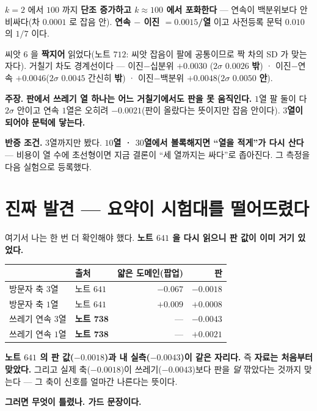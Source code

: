 \documentclass[10pt,a4paper]{article}
\newcommand{\claim}[2]{\begin{claimbox}\textbf{주장.} #1\par\smallskip
  \textcolor{gray!70}{\textbf{반증 조건.} #2}\end{claimbox}}
\begin{document}
$k{=}2$ 에서 $100$ 까지 \textbf{단조 증가하고 $k \approx 100$ 에서 포화한다} ---
연속이 백분위보다 안 비싸다(차 $0.0001$ 로 잡음 안). \textbf{연속 $-$ 이진 $=
0.0015$/열} 이고 사전등록 문턱 $0.010$ 의 $1/7$ 이다.

씨앗 $6$ 을 \textbf{짝지어} 읽었다(노트 $712$: 씨앗 잡음이 팔에 공통이므로
짝 차의 SD 가 맞는 자다). 거칠기 차도 경계선이다 --- 이진$-$십분위 $+0.0030$
($2\sigma$ $0.0026$ \textbf{밖}) · 이진$-$연속 $+0.0046$($2\sigma$ $0.0045$
간신히 \textbf{밖}) · 이진$-$백분위 $+0.0048$($2\sigma$ $0.0050$ \textbf{안}).

\claim{\textbf{판에서 쓰레기 열 하나는 어느 거칠기에서도 판을 못 움직인다.}
$1$열 팔 둘이 다 $2\sigma$ 안이고 연속 $1$열은 오히려 $-0.0021$(판이 올랐다는
뜻이지만 잡음 안이다). \textbf{$3$열이 되어야 문턱에 닿는다.}}
{$3$열까지만 봤다. \textbf{$10$열 · $30$열에서 볼록해지면 ``열을 적게''가 다시
산다} --- 비용이 열 수에 초선형이면 지금 결론이 ``세 열까지는 싸다''로 좁아진다.
그 측정을 다음 실험으로 등록했다.}

\section{진짜 발견 --- 요약이 시험대를 떨어뜨렸다}

여기서 나는 한 번 더 확인해야 했다. \textbf{노트 $641$ 을 다시 읽으니 판 값이 이미
거기 있었다.}

\begin{center}
\begin{tabular}{llrr}
\toprule
& 출처 & 얇은 도메인(팝업) & \textbf{판} \\
\midrule
방문자 축 $3$열 & 노트 $641$ & $-0.067$ & $\mathbf{-0.0018}$ \\
방문자 축 $1$열 & 노트 $641$ & $+0.009$ & $\mathbf{+0.0008}$ \\
\midrule
쓰레기 연속 $3$열 & \textbf{노트 738} & --- & $\mathbf{-0.0043}$ \\
쓰레기 연속 $1$열 & \textbf{노트 738} & --- & $+0.0021$ \\
\bottomrule
\end{tabular}
\end{center}

\textbf{노트 $641$ 의 판 값($-0.0018$)과 내 실측($-0.0043$)이 같은 자리다.} 즉
\textbf{자료는 처음부터 맞았다.} 그리고 실제 축($-0.0018$)이 쓰레기($-0.0043$)보다
판을 \emph{덜} 깎았다는 것까지 맞는다 --- 그 축이 신호를 얼마간 나른다는 뜻이다.

\textbf{그러면 무엇이 틀렸나. 가드 문장이다.}
\end{document}
